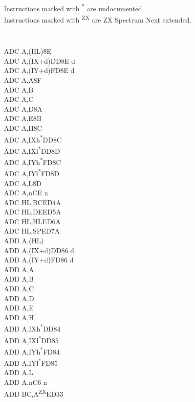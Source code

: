\documentclass[oneside,a4paper]{book}
\begin{document}
Instructions marked with \textsuperscript{*} are undocumented.\\
Instructions marked with \textsuperscript{ZX} are ZX Spectrum Next extended.
\begin{multicols}{3}

\scriptsize
{\tt
\begin{tabbing}
ADC A,(HL){\qquad}{\qquad}{\quad}\=8E\\
ADC A,(IX+d)\>DD8E d\\
ADC A,(IY+d)\>FD8E d\\
ADC A,A\>8F\\
ADC A,B\\
ADC A,C\\
ADC A,D\>8A\\
ADC A,E\>8B\\
ADC A,H\>8C\\
ADC A,IXh\textsuperscript{*}\>DD8C\\
ADC A,IXl\textsuperscript{*}\>DD8D\\
ADC A,IYh\textsuperscript{*}\>FD8C\\
ADC A,IYl\textsuperscript{*}\>FD8D\\
ADC A,L\>8D\\
ADC A,n\>CE n\\
ADC HL,BC\>ED4A\\
ADC HL,DE\>ED5A\\
ADC HL,HL\>ED6A\\
ADC HL,SP\>ED7A\\
ADD A,(HL)\\
ADD A,(IX+d)\>DD86 d\\
ADD A,(IY+d)\>FD86 d\\
ADD A,A\\
ADD A,B\\
ADD A,C\\
ADD A,D\\
ADD A,E\\
ADD A,H\\
ADD A,IXh\textsuperscript{*}\>DD84\\
ADD A,IXl\textsuperscript{*}\>DD85\\
ADD A,IYh\textsuperscript{*}\>FD84\\
ADD A,IYl\textsuperscript{*}\>FD85\\
ADD A,L\\
ADD A,n\>C6 n\\
ADD BC,A\textsuperscript{ZX}\>ED33\\

\end{tabbing}}
\end{multicols}
\end{document}
